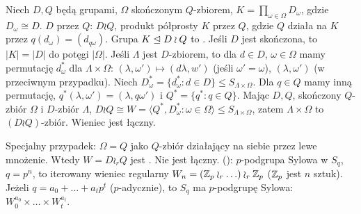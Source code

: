 Niech  $D, Q$ będą grupami, $\Omega$ skończonym $Q$-zbiorem, $K = \prod_{\omega \in \Omega} D_\omega$, gdzie $D_\omega \cong D$.
 $D$ przez $Q$: $D \wr Q$, produkt półprosty $K$ przez $Q$, gdzie $Q$ działa na $K$ przez $q(d_\omega) = (d_{q \omega})$.
Grupa $K \trianglelefteq D \wr Q$ to .
Jeśli $D$ jest skończona, to $|K| = |D|$ do potęgi ${|\Omega|}$.
Jeśli $\Lambda$ jest $D$-zbiorem, to dla $d \in D$, $\omega \in \Omega$ mamy permutację $d_\omega^*$ dla $\Lambda \times \Omega$: $(\lambda, \omega') \mapsto (d \lambda, w')$ (jeśli $\omega' = \omega$), $(\lambda, \omega')$ (w przeciwnym przypadku).
Niech $D_\omega^* = \{d_\omega^* : d \in D\} \le S_{\Lambda \times \Omega}$.
Dla $q \in Q$ mamy inną permutację, $q^*(\lambda, \omega') = (\lambda, q \omega')$ i $Q^* = \{q^* : q \in Q\}$.
Mając $D, Q$, skończony $Q$-zbiór $\Omega$ i $D$-zbiór $\Lambda$, $D \wr Q \cong W = \langle Q^*, D_\omega^* : \omega \in \Omega \rangle \le S_{\Lambda \times \Omega}$, zatem $\Lambda \times \Omega$ to $(D \wr Q)$-zbiór.
Wieniec jest łączny.

Specjalny przypadek: $\Omega = Q$ jako $Q$-zbiór działający na siebie przez lewe mnożenie.
Wtedy $W = D \wr_r Q$ jest .
Nie jest łączny.
 (): $p$-podgrupa Sylowa w $S_q$, $q = p^n$, to iterowany wieniec regularny $W_n = (\mathbb{Z}_p \wr_r \ldots) \wr_r \mathbb{Z}_p$ ($\mathbb{Z}_p$ jest $n$ sztuk).
Jeżeli $q = a_0 + \ldots + a_tp^t$ ($p$-adycznie), to $S_q$ ma $p$-podgrupę Sylowa: $W_0^{a_0} \times \ldots \times W_t^{a_t}$.

